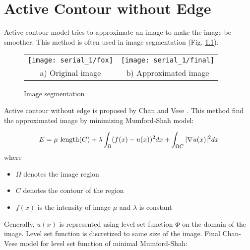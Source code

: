 


\chapter{Active Contour without Edge}
\label{chap:chan}

Active contour model tries to approximate an image to make the image be smoother. This method is often used in image segmentation (Fig. \ref{fig:seg}).

\begin{figure}[ht]
    \centering
    \begin{tabular}{cc}
        \texttt{[image: serial\_1/fox]} & \texttt{[image: serial\_1/final]} \\
        \small a) Original image & \small b) Approximated image
       \end{tabular}
       \caption{Image segmentation}
       \label{fig:seg}
\end{figure} 

Active contour without edge is proposed by Chan and Vese \cite{Chan2001}. This method find the approximated image by minimizing Mumford-Shah model:

\begin{equation}
E = \mu \text{ length}(C) 
+ \lambda\int_{\Omega}(f(x) - u(x))^2 dx
+ \int_{\Omega \\ C}|\nabla u(x)|^2 dx
\end{equation}
where
{\small
\begin{itemize}
    \item $\Omega$ denotes the image region
    \item $C$ denotes the contour of the region
    \item $f(x)$ is the intensity of image
    $\mu$ and $\lambda$ is constant
\end{itemize}
}

Generally, $u(x)$ is represented using level set function $\Phi$ on the domain of the image. Level set function is discretized to same size of the image. Final Chan-Vese model for level set function of minimal Mumford-Shah:


